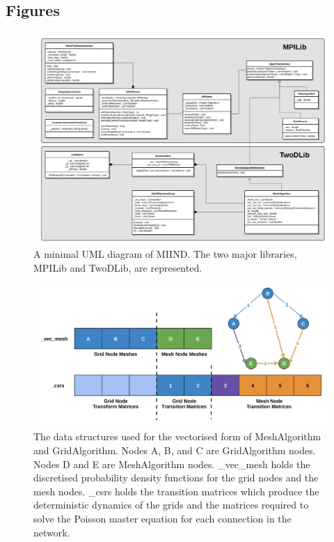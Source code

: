 \documentclass[utf8]{frontiers_suppmat} %
\begin{document}
\newpage
\subsection{Figures}


\begin{figure}[!h]
  \centering
  \includegraphics[width=\columnwidth]{images/miind_uml.pdf}
  \caption{A minimal UML diagram of MIIND. The two major libraries, MPILib and TwoDLib, are represented.}
  \label{fig:uml}
\end{figure}

\begin{figure}[!h]
  \centering
  \includegraphics[width=\columnwidth]{images/neuroinformatics_structure.pdf}
  \caption{The data structures used for the vectorised form of MeshAlgorithm and GridAlgorithm. Nodes A, B, and C are GridAlgorithm nodes. Nodes D and E are MeshAlgorithm nodes. \_vec\_mesh holds the discretised probability density functions for the grid nodes and the mesh nodes. \_csrs holds the transition matrices which produce the deterministic dynamics of the grids and the matrices required to solve the Poisson master equation for each connection in the network. }
  \label{fig:cudastruct}
\end{figure}
\end{document}
